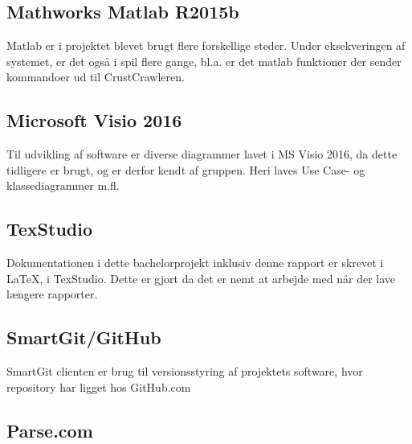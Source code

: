 \subsection*{Mathworks Matlab R2015b}
Matlab er i projektet blevet brugt flere forskellige steder. Under eksekveringen af systemet, er det også i spil flere gange, bl.a. er det matlab funktioner der sender kommandoer ud til CrustCrawleren.

\subsection*{Microsoft Visio 2016}

Til udvikling af software er diverse diagrammer lavet i MS Visio 2016, da dette tidligere er brugt, og er derfor kendt af gruppen. Heri laves Use Case- og klassediagrammer m.fl.

\subsection*{TexStudio}
Dokumentationen i dette bachelorprojekt inklusiv denne rapport er skrevet i \LaTeX, i TexStudio. Dette er gjort da det er nemt at arbejde med når der lave længere rapporter.

\subsection*{SmartGit/GitHub}
SmartGit clienten er brug til versionsstyring af projektets software, hvor repository har ligget hos GitHub.com

\subsection*{Parse.com}


